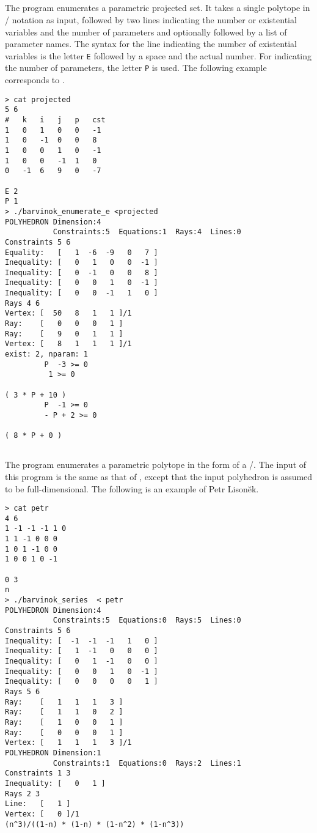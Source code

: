\subsection{\texorpdfstring{\protect{}}
{barvinok\_enumerate\_e}}

The program  enumerates a
parametric projected set.  It takes a single polytope in \PolyLib/
notation as input, followed by two lines indicating the number
or existential variables and the number of parameters and
optionally followed by a list of parameter names.
The syntax for the line indicating the number of existential
variables is the letter \verb+E+ followed by a space and the actual number.
For indicating the number of parameters, the letter \verb+P+ is used.
The following example corresponds to 
.
\begin{verbatim}
> cat projected 
5 6
#   k   i   j   p   cst
1   0   1   0   0   -1
1   0   -1  0   0   8
1   0   0   1   0   -1
1   0   0   -1  1   0
0   -1  6   9   0   -7

E 2
P 1
> ./barvinok_enumerate_e <projected 
POLYHEDRON Dimension:4
           Constraints:5  Equations:1  Rays:4  Lines:0
Constraints 5 6
Equality:   [   1  -6  -9   0   7 ]
Inequality: [   0   1   0   0  -1 ]
Inequality: [   0  -1   0   0   8 ]
Inequality: [   0   0   1   0  -1 ]
Inequality: [   0   0  -1   1   0 ]
Rays 4 6
Vertex: [  50   8   1   1 ]/1
Ray:    [   0   0   0   1 ]
Ray:    [   9   0   1   1 ]
Vertex: [   8   1   1   1 ]/1
exist: 2, nparam: 1
         P  -3 >= 0
          1 >= 0

( 3 * P + 10 )
         P  -1 >= 0
         - P + 2 >= 0

( 8 * P + 0 )
\end{verbatim}

\subsection{\texorpdfstring{\protect{}}
{barvinok\_series}}

The program  enumerates a
parametric polytope in the form of a \rgf/.  
The input of this program is the same as that of
, except that the input polyhedron
is assumed to be full-dimensional.
The following is an example of Petr Lison\u{e}k.
\begin{verbatim}
> cat petr
4 6
1 -1 -1 -1 1 0
1 1 -1 0 0 0
1 0 1 -1 0 0
1 0 0 1 0 -1

0 3
n
> ./barvinok_series  < petr
POLYHEDRON Dimension:4
           Constraints:5  Equations:0  Rays:5  Lines:0
Constraints 5 6
Inequality: [  -1  -1  -1   1   0 ]
Inequality: [   1  -1   0   0   0 ]
Inequality: [   0   1  -1   0   0 ]
Inequality: [   0   0   1   0  -1 ]
Inequality: [   0   0   0   0   1 ]
Rays 5 6
Ray:    [   1   1   1   3 ]
Ray:    [   1   1   0   2 ]
Ray:    [   1   0   0   1 ]
Ray:    [   0   0   0   1 ]
Vertex: [   1   1   1   3 ]/1
POLYHEDRON Dimension:1
           Constraints:1  Equations:0  Rays:2  Lines:1
Constraints 1 3
Inequality: [   0   1 ]
Rays 2 3
Line:   [   1 ]
Vertex: [   0 ]/1
(n^3)/((1-n) * (1-n) * (1-n^2) * (1-n^3))
\end{verbatim}
